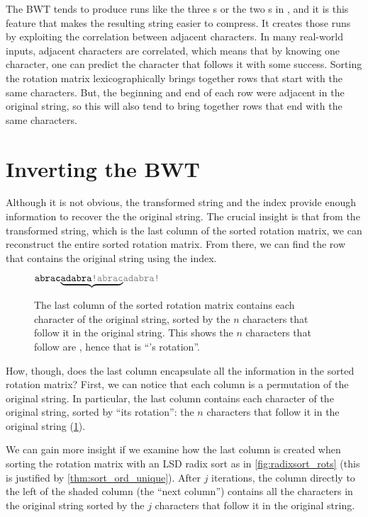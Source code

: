 \documentclass[sigplan,10pt,anonymous,review]{thesis}
\begin{document}
The BWT tends to produce runs like the three s or the two
s in , and it is this feature that makes the
resulting string easier to compress. It creates those runs by
exploiting the correlation between adjacent characters. In many
real-world inputs, adjacent characters are correlated, which means
that by knowing one character, one can predict the character that
follows it with some success. Sorting the rotation matrix
lexicographically brings together rows that start with the same
characters. But, the beginning and end of each row were adjacent in
the original string, so this will also tend to bring together rows
that end with the same characters.

\section{Inverting the BWT}
\label{sec:invert_bwt}

Although it is not obvious, the transformed string and the index
provide enough information to recover the the original string. The
crucial insight is that from the transformed string, which is the last
column of the sorted rotation matrix, we can reconstruct the entire
sorted rotation matrix. From there, we can find the row that contains
the original string using the index.

\begin{figure}
  $
  {\var{abra\textbf{c}}}%
  {\underbrace{\var{adabra\textcolor{gray}{!abrac}}}}%
  {\var{\textcolor{gray}{adabra!}}}
  $
  \caption{The last column of the sorted rotation matrix contains each
    character of the original string, sorted by the $n$ characters
    that follow it in the original string. This shows the $n$
    characters that follow  are , hence that
    is ``'s rotation''.}
  \label{fig:last_col_key}
\end{figure}

How, though, does the last column encapsulate all the information in
the sorted rotation matrix? First, we can notice that each column is a
permutation of the original string. In particular, the last column
contains each character of the original string, sorted by ``its
rotation'': the $n$ characters that follow it in the original string
(\cref{fig:last_col_key}).

We can gain more insight if we examine how the last column is created
when sorting the rotation matrix with an LSD radix sort as in
\cref{fig:radixsort_rots} (this is justified by
\cref{thm:sort_ord_unique}). After $j$ iterations, the column directly
to the left of the shaded column (the ``next column'') contains all
the characters in the original string sorted by the $j$ characters
that follow it in the original string.
\end{document}

